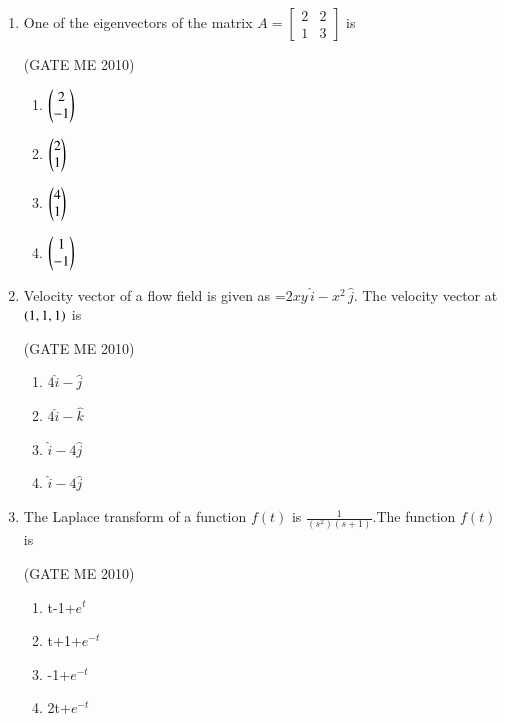 \documentclass[journal,12pt,onecolumn]{IEEEtran}
\theoremstyle{remark}
\begin{document}
\begin{enumerate}
 \item One of the eigenvectors of the matrix
\( A = \begin{bmatrix} 2 & 2 \\ 1 & 3 \end{bmatrix} \) is

\hfill{(GATE ME 2010)}
\begin{multicols}{4}
\begin{enumerate}
    \item \( \begin{pmatrix}2 \\ -1\end{pmatrix} \)
    \item \( \begin{pmatrix}2 \\ 1\end{pmatrix} \)
    \item \( \begin{pmatrix}4 \\ 1\end{pmatrix} \)
    \item \( \begin{pmatrix}1 \\ -1\end{pmatrix} \)
\end{enumerate}
\end{multicols}



\item Velocity vector of a flow field is given as   =$2xy\,\hat{i} - x^2\,\hat{j}$.
The velocity vector at $\left(1,1,1\right)$ is

  \hfill{(GATE ME 2010)}

\begin{multicols}{2}
\begin{enumerate}
    \item $4\hat{i}-\hat{j}$
    \item $4\hat{i}-\hat{k}$
    \item $\hat{i}-4\hat{j}$
    \item $\hat{i}-4\hat{j}$
\end{enumerate}
\end{multicols}


\item The Laplace transform of a function $f(t)$ is $\frac{1}{(s^{2})(s+1)}$.The function $f(t)$ is

  \hfill{(GATE ME 2010)}
  
\begin{multicols}{4}
\begin{enumerate}

\item t-1+$e^{t}$
\item t+1+$e^{-t}$
\item -1+$e^{-t}$
\item 2t+$e^{-t}$
\end{enumerate}
\end{multicols}



\end{enumerate}
\end{document}
